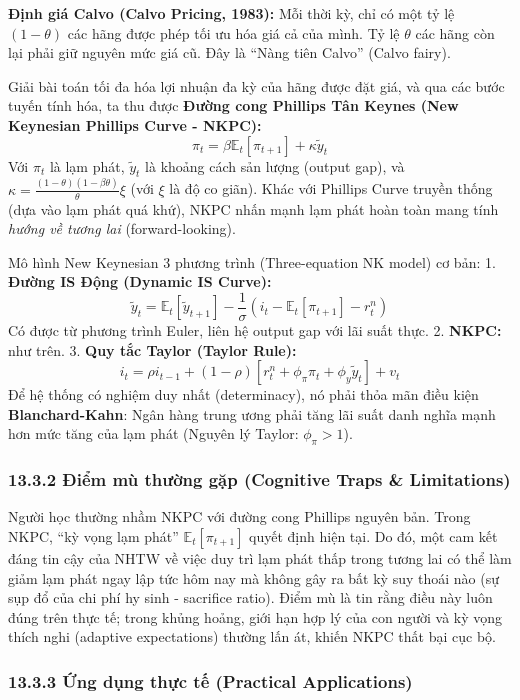 \documentclass[
]{article}
\begin{document}
\textbf{Định giá Calvo (Calvo Pricing, 1983):} Mỗi thời kỳ, chỉ có một
tỷ lệ \((1-\theta)\) các hãng được phép tối ưu hóa giá cả của mình. Tỷ
lệ \(\theta\) các hãng còn lại phải giữ nguyên mức giá cũ. Đây là ``Nàng
tiên Calvo'' (Calvo fairy).

Giải bài toán tối đa hóa lợi nhuận đa kỳ của hãng được đặt giá, và qua
các bước tuyến tính hóa, ta thu được \textbf{Đường cong Phillips Tân
Keynes (New Keynesian Phillips Curve - NKPC):}
\[ \pi_t = \beta \mathbb{E}_t [\pi_{t+1}] + \kappa \tilde{y}_t \] Với
\(\pi_t\) là lạm phát, \(\tilde{y}_t\) là khoảng cách sản lượng (output
gap), và \(\kappa = \frac{(1-\theta)(1-\beta\theta)}{\theta} \xi\) (với
\(\xi\) là độ co giãn). Khác với Phillips Curve truyền thống (dựa vào
lạm phát quá khứ), NKPC nhấn mạnh lạm phát hoàn toàn mang tính
\emph{hướng về tương lai} (forward-looking).

Mô hình New Keynesian 3 phương trình (Three-equation NK model) cơ bản:
1. \textbf{Đường IS Động (Dynamic IS Curve):}
\[ \tilde{y}_t = \mathbb{E}_t [\tilde{y}_{t+1}] - \frac{1}{\sigma} (i_t - \mathbb{E}_t[\pi_{t+1}] - r_t^n) \]
Có được từ phương trình Euler, liên hệ output gap với lãi suất thực. 2.
\textbf{NKPC:} như trên. 3. \textbf{Quy tắc Taylor (Taylor Rule):}
\[ i_t = \rho i_{t-1} + (1-\rho)[r_t^n + \phi_\pi \pi_t + \phi_y \tilde{y}_t] + v_t \]
Để hệ thống có nghiệm duy nhất (determinacy), nó phải thỏa mãn điều kiện
\textbf{Blanchard-Kahn}: Ngân hàng trung ương phải tăng lãi suất danh
nghĩa mạnh hơn mức tăng của lạm phát (Nguyên lý Taylor:
\(\phi_\pi > 1\)).

\subsubsection{13.3.2 Điểm mù thường gặp (Cognitive Traps \&
Limitations)}\label{ux111iux1ec3m-muxf9-thux1b0ux1eddng-gux1eb7p-cognitive-traps-limitations-92}

Người học thường nhầm NKPC với đường cong Phillips nguyên bản. Trong
NKPC, ``kỳ vọng lạm phát'' \(\mathbb{E}_t[\pi_{t+1}]\) quyết định hiện
tại. Do đó, một cam kết đáng tin cậy của NHTW về việc duy trì lạm phát
thấp trong tương lai có thể làm giảm lạm phát ngay lập tức hôm nay mà
không gây ra bất kỳ suy thoái nào (sự sụp đổ của chi phí hy sinh -
sacrifice ratio). Điểm mù là tin rằng điều này luôn đúng trên thực tế;
trong khủng hoảng, giới hạn hợp lý của con người và kỳ vọng thích nghi
(adaptive expectations) thường lấn át, khiến NKPC thất bại cục bộ.

\subsubsection{13.3.3 Ứng dụng thực tế (Practical
Applications)}\label{ux1ee9ng-dux1ee5ng-thux1ef1c-tux1ebf-practical-applications-48}
\end{document}
